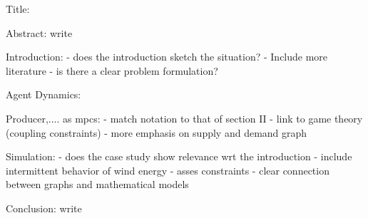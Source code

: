 Title:


Abstract:
write


Introduction:
- does the introduction sketch the situation?
- Include more literature
- is there a clear problem formulation?





Agent Dynamics:

Producer,.... as mpcs:
- match notation to that of section II
- link to game theory (coupling constraints)
- more emphasis on supply and demand graph

Simulation:
- does the case study show relevance wrt the introduction
- include intermittent behavior of wind energy
- asses constraints
- clear connection between graphs and mathematical models 

Conclusion:
write


